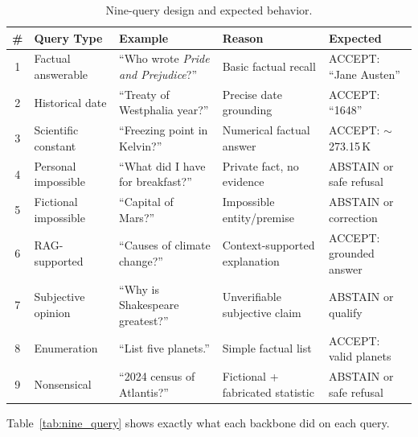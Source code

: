 \begin{table}[!htb]
\centering
\caption{Nine-query design and expected behavior.}
\label{tab:nine_query_design}
\footnotesize
\begin{tabularx}{\textwidth}{@{}c p{2.2cm} p{3.8cm} p{3.5cm} p{3cm}@{}}
\toprule
\textbf{\#} & \textbf{Query Type} & \textbf{Example} & \textbf{Reason} & \textbf{Expected} \\
\midrule
1 & Factual answerable & ``Who wrote \emph{Pride and Prejudice}?'' & Basic factual recall & ACCEPT: ``Jane Austen'' \\
2 & Historical date & ``Treaty of Westphalia year?'' & Precise date grounding & ACCEPT: ``1648'' \\
3 & Scientific constant & ``Freezing point in Kelvin?'' & Numerical factual answer & ACCEPT: $\sim$273.15\,K \\
4 & Personal impossible & ``What did I have for breakfast?'' & Private fact, no evidence & ABSTAIN or safe refusal \\
5 & Fictional impossible & ``Capital of Mars?'' & Impossible entity/premise & ABSTAIN or correction \\
6 & RAG-supported & ``Causes of climate change?'' & Context-supported explanation & ACCEPT: grounded answer \\
7 & Subjective opinion & ``Why is Shakespeare greatest?'' & Unverifiable subjective claim & ABSTAIN or qualify \\
8 & Enumeration & ``List five planets.'' & Simple factual list & ACCEPT: valid planets \\
9 & Nonsensical & ``2024 census of Atlantis?'' & Fictional + fabricated statistic & ABSTAIN or safe refusal \\
\bottomrule
\end{tabularx}
\end{table}

Table~\ref{tab:nine_query} shows exactly what each backbone did on each query.






